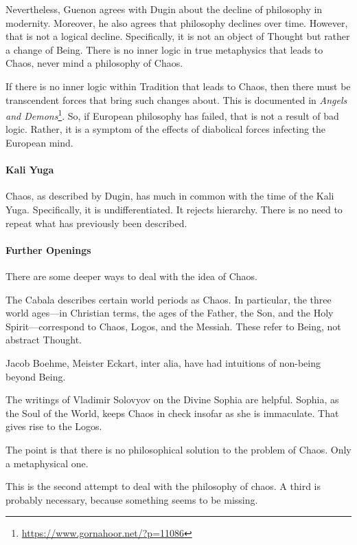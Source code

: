 Nevertheless, Guenon agrees with Dugin about the decline of philosophy in modernity. Moreover, he also agrees that philosophy declines over time. However, that is not a logical decline. Specifically, it is not an object of Thought but rather a change of Being. There is no inner logic in true metaphysics that leads to Chaos, never mind a philosophy of Chaos.

If there is no inner logic within Tradition that leads to Chaos, then there must be transcendent forces that bring such changes about. This is documented in \textit{Angels and Demons}\footnote{\url{https://www.gornahoor.net/?p=11086}}. So, if European philosophy has failed, that is not a result of bad logic. Rather, it is a symptom of the effects of diabolical forces infecting the European mind.

\paragraph{Kali Yuga}
Chaos, as described by Dugin, has much in common with the time of the Kali Yuga. Specifically, it is undifferentiated. It rejects hierarchy. There is no need to repeat what has previously been described.

\paragraph{Further Openings}
There are some deeper ways to deal with the idea of Chaos.

The Cabala describes certain world periods as Chaos. In particular, the three world ages—in Christian terms, the ages of the Father, the Son, and the Holy Spirit—correspond to Chaos, Logos, and the Messiah. These refer to Being, not abstract Thought.

Jacob Boehme, Meister Eckart, inter alia, have had intuitions of non-being beyond Being.

The writings of Vladimir Solovyov on the Divine Sophia are helpful. Sophia, as the Soul of the World, keeps Chaos in check insofar as she is immaculate. That gives rise to the Logos.

The point is that there is no philosophical solution to the problem of Chaos. Only a metaphysical one.

This is the second attempt to deal with the philosophy of chaos. A third is probably necessary, because something seems to be missing.




